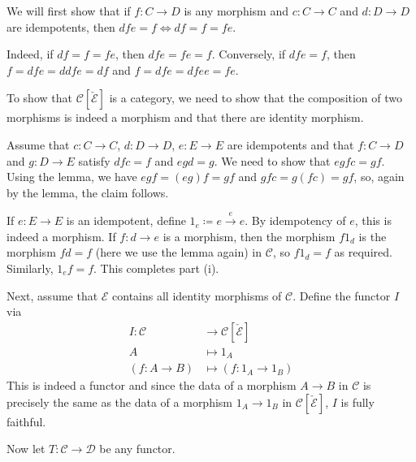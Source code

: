 We will first show that if $f\colon C\to D$ is any morphism and $c : C \to C$ and
$d : D \to D$ are idempotents, then $dfe = f \iff df = f = fe$.

Indeed, if $df=f=fe$, then $dfe = fe = f$. Conversely, if $dfe = f$, then
$f = dfe = ddfe = df$ and $f = dfe = dfee = fe$.

To show that $\mathcal{C}[\check{\mathcal{E}}]$ is a category, we need to show
that the composition of two morphisms is indeed a morphism and that there are
identity morphism.

Assume that $c\colon C \to C$, $d\colon D\to D$, $e\colon E \to E$ are idempotents
and that $f\colon C\to D$ and $g\colon D\to E$ satisfy $dfc = f$ and $egd = g$.
We need to show that $egfc = gf$. Using the lemma, we have $egf = (eg)f = gf$ and
$gfc = g(fc) = gf$, so, again by the lemma, the claim follows.

If $e\colon E \to E$ is an idempotent, define $1_e\coloneqq e \stackrel{e}{\longrightarrow} e$.
By idempotency of $e$, this is indeed a morphism. If $f\colon d \to e$ is a morphism,
then the morphism $f1_d$ is the morphism $fd = f$ (here we use the lemma again)
in $\mathcal{C}$, so $f1_d = f$ as required. Similarly, $1_ef = f$. This completes part (i).

Next, assume that $\mathcal{E}$ contains all identity morphisms of $\mathcal{C}$.
Define the functor $I$ via
\begin{align*}
	I\colon \mathcal{C}&\to \mathcal{C}[\check{\mathcal{E}}]\\
	A &\mapsto 1_A\\
	(f\colon A\to B)&\mapsto (f\colon 1_A\to 1_B)
\end{align*}
This is indeed a functor and since the data of a morphism $A\to B$ in $\mathcal{C}$ is
precisely the same as the data of a morphism $1_A \to 1_B$ in $\mathcal{C}[\check{\mathcal{E}}]$,
$I$ is fully faithful.

Now let $T\colon \mathcal{C}\to \mathcal{D}$ be any functor.

